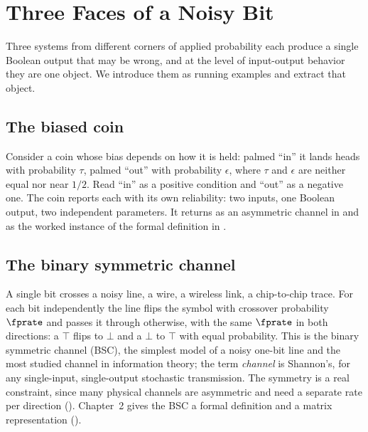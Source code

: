 %
%
%
%
%

\section{Three Faces of a Noisy Bit}
\label{sec:three-faces}

Three systems from different corners of applied probability each produce a
single Boolean output that may be wrong, and at the level of input-output
behavior they are one object. We introduce them as running examples and
extract that object.

\subsection*{The biased coin}

Consider a coin whose bias depends on how it is held: palmed ``in'' it lands
heads with probability $\tau$, palmed ``out'' with probability $\epsilon$,
where $\tau$ and $\epsilon$ are neither equal nor near $1/2$. Read ``in'' as a
positive condition and ``out'' as a negative one. The coin reports each with
its own reliability: two inputs, one Boolean output, two independent
parameters. It returns as an asymmetric channel in
 and as the worked instance of the formal
definition in .

\subsection*{The binary symmetric channel}

A single bit crosses a noisy line, a wire, a wireless link, a chip-to-chip
trace. For each bit independently the line flips the symbol with crossover
probability $\fprate$ and passes it through otherwise, with the same $\fprate$
in both directions: a $\top$ flips to $\bot$ and a $\bot$ to $\top$ with equal
probability. This is the binary symmetric channel (BSC), the simplest model of
a noisy one-bit line and the most studied channel in information theory; the
term \emph{channel} is Shannon's, for any single-input, single-output
stochastic transmission. The symmetry is a real constraint, since many
physical channels are asymmetric and need a separate rate per direction
(). Chapter~2 gives the BSC a formal definition
and a matrix representation ().

